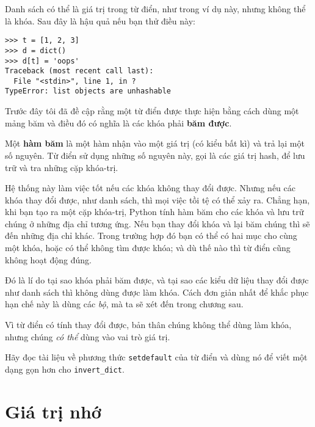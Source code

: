 \documentclass[11pt]{book}
\begin{document}
Danh sách có thể là giá trị trong từ điển, như trong ví dụ này, nhưng
không thể là khóa. Sau đây là hậu quả nếu bạn thử điều này:



\beforeverb
\begin{verbatim}
>>> t = [1, 2, 3]
>>> d = dict()
>>> d[t] = 'oops'
Traceback (most recent call last):
  File "<stdin>", line 1, in ?
TypeError: list objects are unhashable
\end{verbatim}
\afterverb
%
Trước đây tôi đã đề cập rằng một từ điển được thực hiện bằng cách
dùng một mảng băm và điều đó có nghĩa là các khóa phải {\bf băm được}.


Một {\bf hàm băm} là một hàm nhận vào một giá trị (có kiểu bất kì)
và trả lại một số nguyên. Từ điển sử dụng những số nguyên này,
gọi là các giá trị hash, để lưu trữ và tra những cặp khóa-trị.


Hệ thống này làm việc tốt nếu các khóa không thay đổi được. 
Nhưng nếu các khóa thay đổi được, như danh sách, thì mọi việc
tồi tệ có thể xảy ra. Chẳng hạn, khi bạn tạo ra một cặp khóa-trị,
Python tính hàm băm cho các khóa và lưu trữ chúng ở những địa chỉ tương
ứng. Nếu bạn thay đổi khóa và lại băm chúng thì sẽ đến những
địa chỉ khác. Trong trường hợp đó bạn có thể có hai mục cho cùng
một khóa, hoặc có thể không tìm được khóa; và dù thế nào thì 
từ điển cũng không hoạt động đúng.

Đó là lí do tại sao khóa phải băm được, và tại sao các kiểu dữ liệu
thay đổi được như danh sách thì không dùng được làm khóa. Cách 
đơn giản nhất để khắc phục hạn chế này là dùng các {\em bộ}, mà 
ta sẽ xét đến trong chương sau.

Vì từ điển có tính thay đổi được, bản thân chúng không thể dùng làm khóa,
nhưng chúng {\em có thể} dùng vào vai trò giá trị.

\begin{ex}
Hãy đọc tài liệu về phương thức {\tt setdefault} của từ điển và
dùng nó để viết một dạng gọn hơn cho \verb"invert_dict".


\end{ex}


\section{Giá trị nhớ}
\end{document}
